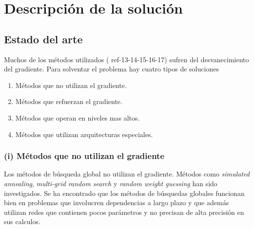 \section{Descripción de la solución}
\begin{comment}
En la presente sección se describe el estado del arte y las características de la solución. Se explicara cual es el propósito de la solución, y posteriormente los alcances y limitaciones establecidas.
\end{comment}

\subsection{Estado del arte}
Muchos de los métodos utilizados (\cite{Elman1990, Schmidhuber1992b, Pearlmutter1989, Pearlmutter1995} ref-13-14-15-16-17) sufren del desvanecimiento del gradiente. Para solventar el problema hay cuatro tipos de soluciones





\begin{enumerate}
	\item Métodos que no utilizan el gradiente.
	\item Métodos que refuerzan el gradiente.
	\item Métodos que operan en niveles mas altos.
	\item Métodos que utilizan arquitecturas especiales.
\end{enumerate}

\subsubsection{(i) Métodos que no utilizan el gradiente}
Los métodos de búsqueda global no utilizan el gradiente. Métodos como {\em simulated annealing}, {\em multi-grid random search} \cite{Bengio1994} y {\em random weight guessing} \cite{Schmidhuber1996} han sido investigados. Se ha encontrado que los métodos de búsquedas globales funcionan bien en problemas que involucren dependencias a largo plazo y que además utilizan redes que contienen pocos parámetros y no precisan de alta precisión en sus calculos.

